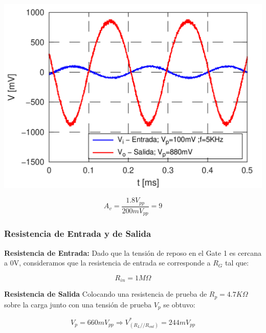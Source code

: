 \documentclass[a4paper, 10pt, spanish]{article}
\begin{document}
\begin{center}
  \includegraphics[width=.7\textwidth]{AvTRUCHO.png}
  \label{fig:av_med}
\end{center}


\begin{equation}
  A_v=\frac{1.8V_{pp}}{200mV_{pp}}=9
\end{equation}

\subsubsection{Resistencia de Entrada y de Salida}
\textbf{Resistencia de Entrada:}
Dado que la tensión de reposo en el Gate 1 es cercana a 0V, consideramos que la resistencia de entrada se corresponde a $R_G$ tal que:

\begin{equation}
  R_{in}=1M\Omega
\end{equation}

\textbf{Resistencia de Salida}
Colocando una resistencia de prueba de $R_p = 4.7K\Omega$ sobre la carga junto con una tensión de prueba $V_p$ se obtuvo:

\begin{equation}
  V_p= 660mV_{pp} \Rightarrow V^*_{(R_L//R_{out})} = 244 mV_{pp}
\end{equation}
\end{document}
